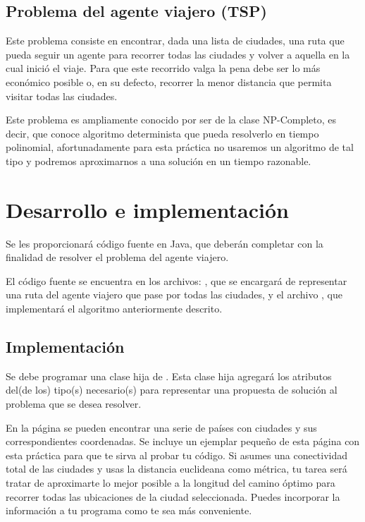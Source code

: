 \subsection{Problema del agente viajero (TSP)}

Este problema consiste en encontrar, dada una lista de ciudades, una ruta que pueda seguir un agente para recorrer todas las ciudades y volver a aquella en la cual inició el viaje.  Para que este recorrido valga la pena debe ser lo más económico posible o, en su defecto, recorrer la menor distancia que permita visitar todas las ciudades.

Este problema es ampliamente conocido por ser de la clase NP-Completo, es decir, que conoce algoritmo determinista que pueda resolverlo en tiempo polinomial, afortunadamente para esta práctica no usaremos un algoritmo de tal tipo y podremos aproximarnos a una solución en un tiempo razonable.



\section{Desarrollo e implementaci\'on}

Se les proporcionará código fuente en Java, que deberán completar con la finalidad de resolver el problema del agente viajero.

El código fuente se encuentra en los archivos: , que se encargará de representar una ruta del agente viajero que pase por todas las ciudades, y el archivo , que implementará el algoritmo anteriormente descrito.

\subsection{Implementaci\'on}

Se debe programar una clase hija de .  Esta clase hija agregará los atributos del(de los) tipo(s) necesario(s) para representar una propuesta de solución al problema que se desea resolver.

En la página  se pueden encontrar una serie de países con ciudades y sus correspondientes coordenadas.  Se incluye un ejemplar pequeño de esta página con esta práctica para que te sirva al probar tu código.  Si asumes una conectividad total de las ciudades y usas la distancia euclideana como métrica, tu tarea será tratar de aproximarte lo mejor posible a la longitud del camino óptimo para recorrer todas las ubicaciones de la ciudad seleccionada.  Puedes incorporar la información a tu programa como te sea más conveniente.

